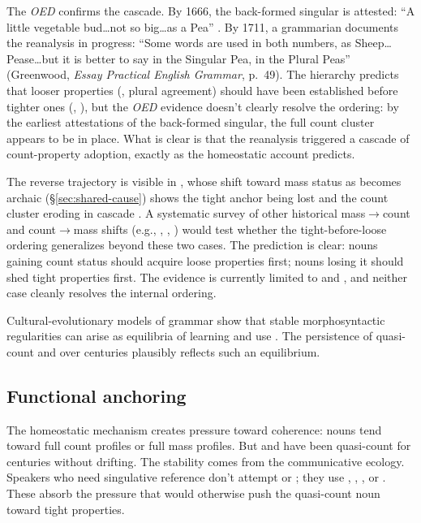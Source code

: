 \documentclass[12pt,a4paper]{article}
\begin{document}
The \textit{OED} confirms the cascade. By 1666, the back-formed singular is attested: \enquote{A little vegetable bud\ldots not so big\ldots as a Pea} \citep[s.v.\ , \textit{n.\textsuperscript{1}}, sense I.1.a]{oed}. By 1711, a grammarian documents the reanalysis in progress: \enquote{Some words are used in both numbers, as Sheep\ldots Pease\ldots but it is better to say in the Singular Pea, in the Plural Peas} (Greenwood, \textit{Essay Practical English Grammar}, p.~49). The hierarchy predicts that looser properties (, plural agreement) should have been established before tighter ones (, ), but the \textit{OED} evidence doesn't clearly resolve the ordering: by the earliest attestations of the back-formed singular, the full count cluster appears to be in place. What is clear is that the reanalysis triggered a cascade of count-property adoption, exactly as the homeostatic account predicts.

The reverse trajectory is visible in , whose shift toward mass status as  becomes archaic (\S\ref{sec:shared-cause}) shows the tight anchor being lost and the count cluster eroding in cascade \citep{garner2016}. A systematic survey of other historical mass$\to$count and count$\to$mass shifts (e.g., , , ) would test whether the tight-before-loose ordering generalizes beyond these two cases. The prediction is clear: nouns gaining count status should acquire loose properties first; nouns losing it should shed tight properties first. The evidence is currently limited to  and , and neither case cleanly resolves the internal ordering.

Cultural-evolutionary models of grammar show that stable morphosyntactic regularities can arise as equilibria of learning and use \citep{kirby2008}. The persistence of quasi-count  and  over centuries plausibly reflects such an equilibrium.

\subsection{Functional anchoring}\label{sec:anchoring}

The homeostatic mechanism creates pressure toward coherence: nouns tend toward full count profiles or full mass profiles. But  and  have been quasi-count for centuries without drifting. The stability comes from the communicative ecology. Speakers who need singulative reference don't attempt  or ; they use , , , or . These  absorb the pressure that would otherwise push the quasi-count noun toward tight properties.
\end{document}
